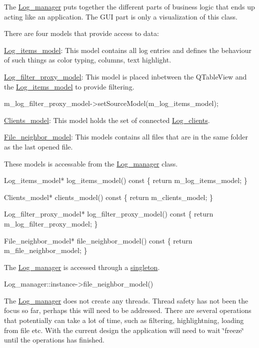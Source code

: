 The \hyperlink{class_log__viewer_1_1_log__manager}{Log\-\_\-manager} puts together the different parts of business logic that ends up acting like an application. The G\-U\-I part is only a visualization of this class.

There are four models that provide access to data\-:
\begin{DoxyItemize}
\item \hyperlink{class_log__viewer_1_1_log__items__model}{Log\-\_\-items\-\_\-model}\-: This model contains all log entries and defines the behaviour of such things as color typing, columns, text highlight.
\item \hyperlink{class_log__viewer_1_1_log__filter__proxy__model}{Log\-\_\-filter\-\_\-proxy\-\_\-model}\-: This model is placed inbetween the Q\-Table\-View and the \hyperlink{class_log__viewer_1_1_log__items__model}{Log\-\_\-items\-\_\-model} to provide filtering. 
\begin{DoxyCode}
m\_log\_filter\_proxy\_model->setSourceModel(m\_log\_items\_model);
\end{DoxyCode}

\item \hyperlink{class_log__viewer_1_1_clients__model}{Clients\-\_\-model}\-: This model holds the set of connected \hyperlink{class_log__viewer_1_1_log__client}{Log\-\_\-clients}.
\item \hyperlink{class_log__viewer_1_1_file__neighbor__model}{File\-\_\-neighbor\-\_\-model}\-: This models contains all files that are in the same folder as the last opened file.
\end{DoxyItemize}

These models is accessable from the \hyperlink{class_log__viewer_1_1_log__manager}{Log\-\_\-manager} class. 
\begin{DoxyCode}
Log\_items\_model* log\_items\_model()\textcolor{keyword}{ const }\{
    \textcolor{keywordflow}{return} m\_log\_items\_model;
\}

Clients\_model* clients\_model()\textcolor{keyword}{ const }\{
    \textcolor{keywordflow}{return} m\_clients\_model;
\}

Log\_filter\_proxy\_model* log\_filter\_proxy\_model()\textcolor{keyword}{ const }\{
    \textcolor{keywordflow}{return} m\_log\_filter\_proxy\_model;
\}

File\_neighbor\_model* file\_neighbor\_model()\textcolor{keyword}{ const }\{
    \textcolor{keywordflow}{return} m\_file\_neighbor\_model;
\}
\end{DoxyCode}


The \hyperlink{class_log__viewer_1_1_log__manager}{Log\-\_\-manager} is accessed through a \hyperlink{class_singleton}{singleton}. 
\begin{DoxyCode}
Log\_manager::instance->file\_neighbor\_model()
\end{DoxyCode}


The \hyperlink{class_log__viewer_1_1_log__manager}{Log\-\_\-manager} does not create any threads. Thread safety has not been the focus so far, perhaps this will need to be addressed. There are several operations that potentially can take a lot of time, such as filtering, highlightning, loading from file etc. With the current design the application will need to wait \char`\"{}freeze\char`\"{} until the operations has finished. 
